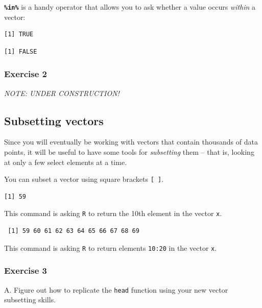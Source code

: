 \documentclass[
]{book}
\begin{document}
\textbf{\texttt{\%in\%}} is a handy operator that allows you to ask whether a value occurs \emph{within} a vector:

\begin{verbatim}
[1] TRUE
\end{verbatim}

\begin{verbatim}
[1] FALSE
\end{verbatim}

\hypertarget{exercise-2-1}{%
\subsubsection*{Exercise 2}\label{exercise-2-1}}

\emph{NOTE: UNDER CONSTRUCTION!}

\hypertarget{subsetting-vectors}{%
\subsection*{Subsetting vectors}\label{subsetting-vectors}}

Since you will eventually be working with vectors that contain thousands of data points, it will be useful to have some tools for \emph{subsetting} them -- that is, looking at only a few select elements at a time.

You can subset a vector using square brackets \texttt{{[}\ {]}}.

\begin{verbatim}
[1] 59
\end{verbatim}

This command is asking \texttt{R} to return the 10th element in the vector \texttt{x}.

\begin{verbatim}
 [1] 59 60 61 62 63 64 65 66 67 68 69
\end{verbatim}

This command is asking \texttt{R} to return elements \texttt{10:20} in the vector \texttt{x}.

\hypertarget{exercise-3-2}{%
\subsubsection*{Exercise 3}\label{exercise-3-2}}

A. Figure out how to replicate the \texttt{head} function using your new vector subsetting skills.
\end{document}
